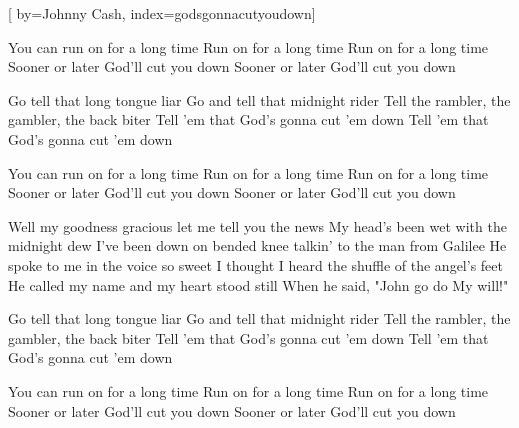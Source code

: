 
[%
    by={Johnny Cash},
    index={godsgonnacutyoudown}]


    \label{godsgonnacutyoudown}


    \beginchorus
        You can run on for a long time
        Run on for a long time
        Run on for a long time
        Sooner or later God'll cut you down
        Sooner or later God'll cut you down
    \endchorus

    \beginverse*
        Go tell that long tongue liar
        Go and tell that midnight rider
        Tell the rambler, the gambler, the back biter
        Tell 'em that God's gonna cut 'em down
        Tell 'em that God's gonna cut 'em down
    \endverse

    \beginchorus
        You can run on for a long time
        Run on for a long time
        Run on for a long time
        Sooner or later God'll cut you down
        Sooner or later God'll cut you down
    \endchorus

    \beginverse
        Well my goodness gracious let me tell you the news
        My head's been wet with the midnight dew
        I've been down on bended knee talkin' to the man from Galilee
        He spoke to me in the voice so sweet
        I thought I heard the shuffle of the angel's feet
        He called my name and my heart stood still
        When he said, "John go do My will!"
    \endverse

    \beginverse*
        Go tell that long tongue liar
        Go and tell that midnight rider
        Tell the rambler, the gambler, the back biter
        Tell 'em that God's gonna cut 'em down
        Tell 'em that God's gonna cut 'em down
    \endverse

    \beginchorus
        You can run on for a long time
        Run on for a long time
        Run on for a long time
        Sooner or later God'll cut you down
        Sooner or later God'll cut you down
    \endchorus

